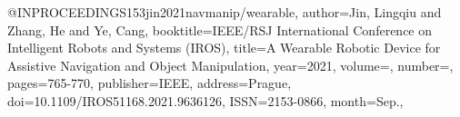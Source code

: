 @INPROCEEDINGS{153jin2021navmanip/wearable,
author={Jin, Lingqiu and Zhang, He and Ye, Cang},
booktitle={IEEE/RSJ International Conference on Intelligent Robots and Systems (IROS)}, 
title={A Wearable Robotic Device for Assistive Navigation and Object Manipulation}, 
year={2021},
volume={},
number={},
pages={765-770},
publisher={IEEE},
address={Prague},
doi={10.1109/IROS51168.2021.9636126},
ISSN={2153-0866},
month={Sep.},}
